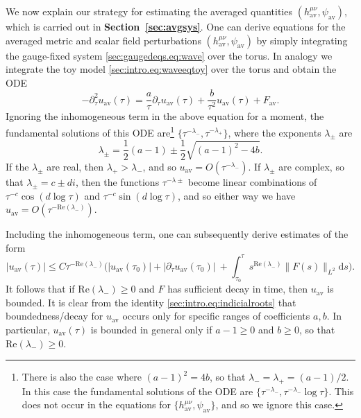 \documentclass{article}
\newcommand{\av}{\mathrm{av}}
\newcommand{\de}{\mathrm{d}}
\newcommand{\pa}{\partial}
\begin{document}
We now explain our strategy for estimating the averaged quantities $(h_{\av}^{\mu\nu},\psi_{\av})$, which is carried out in \textbf{Section~\ref{sec:avgsys}}. One can derive equations for the averaged metric and scalar field perturbations $(h_{\av}^{\mu\nu},\psi_{\av})$ by simply integrating the gauge-fixed system \eqref{sec:gaugedeqs.eq:wave} over the torus. In analogy we integrate the toy model \eqref{sec:intro.eq:waveeqtoy} over the torus and obtain the ODE
\begin{equation}
    -\pa_\tau^2 u_{\av}(\tau) = \frac{a}{\tau}\pa_\tau u_{\av}(\tau) + \frac{b}{\tau^2}u_{\av}(\tau) + F_\av.
\end{equation}
Ignoring the inhomogeneous term in the above equation for a moment, the fundamental solutions of this ODE are\footnote{There is also the case where $(a-1)^2 = 4b$, so that $\lambda_- = \lambda_+ = (a-1)/2$. In this case the fundamental solutions of the ODE are $\{\tau^{-\lambda_-},\tau^{-\lambda_-}\log \tau\}$. This does not occur in the equations for $\{h_{\av}^{\mu\nu},\psi_{\av}\}$, and so we ignore this case.} $\{\tau^{-\lambda_-},\tau^{-\lambda_+}\}$, where the exponents $\lambda_\pm$ are
\begin{equation}\label{sec:intro.eq:indicialroots}
    \lambda_{\pm} = \frac{1}{2}(a-1)\pm \frac{1}{2}\sqrt{(a-1)^2-4b}.
\end{equation}
If the $\lambda_{\pm}$ are real, then $\lambda_+ > \lambda_-$, and so $u_{\av} = O(\tau^{-\lambda_-})$. If $\lambda_\pm$ are complex, so that $\lambda_\pm = c \pm di$, then the functions $\tau^{-\lambda{\pm}}$ become linear combinations of $\tau^{-c}\cos(d\log \tau)$ and $\tau^{-c}\sin(d\log \tau)$, and so either way we have $u_\av = O(\tau^{-\mathrm{Re}(\lambda_-)})$.

Including the inhomogeneous term, one can subsequently derive estimates of the form
\begin{equation}
    |u_\av(\tau)| \leq C \tau^{-\mathrm{Re}(\lambda_-)} \Big(|u_\av(\tau_0)| + |\pa_\tau u_{\av}(\tau_0)|\ + \int_{\tau_0}^\tau s^{\mathrm{Re}(\lambda_-)}\|F(s)\|_{L^2}\de s\Big).
\end{equation}
It follows that if $\mathrm{Re}(\lambda_-) \geq 0$ and $F$ has sufficient decay in time, then $u_\av$ is bounded. It is clear from the identity \eqref{sec:intro.eq:indicialroots} that boundedness/decay for $u_{\av}$ occurs only for specific ranges of coefficients $a,b$. In particular, $u_{\av}(\tau)$ is bounded in general only if $a - 1 \geq 0$ and $b \geq 0$, so that $\mathrm{Re}(\lambda_-) \geq 0$.
\end{document}
